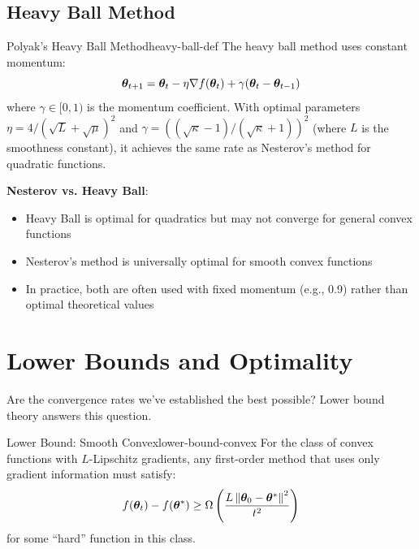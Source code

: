 \documentclass[../../main.tex]{subfiles}
\begin{document}
\subsection{Heavy Ball Method}

\begin{definition}{Polyak's Heavy Ball Method}{heavy-ball-def}
The heavy ball method uses constant momentum:
\[
    \boldsymbol{\theta}_{t+1} = \boldsymbol{\theta}_t - \eta \nabla f(\boldsymbol{\theta}_t) + \gamma(\boldsymbol{\theta}_t - \boldsymbol{\theta}_{t-1})
\]
where $\gamma \in [0, 1)$ is the momentum coefficient. With optimal parameters $\eta = 4/({\sqrt{L} + \sqrt{\mu}})^2$ and $\gamma = ((\sqrt{\kappa}-1)/(\sqrt{\kappa}+1))^2$ (where $L$ is the smoothness constant), it achieves the same rate as Nesterov's method for quadratic functions.
\end{definition}

\begin{important}
\textbf{Nesterov vs. Heavy Ball}:
\begin{itemize}
    \item Heavy Ball is optimal for quadratics but may not converge for general convex functions
    \item Nesterov's method is universally optimal for smooth convex functions
    \item In practice, both are often used with fixed momentum (e.g., 0.9) rather than optimal theoretical values
\end{itemize}
\end{important}

\section{Lower Bounds and Optimality}
\label{sec:lower-bounds}

Are the convergence rates we've established the best possible? Lower bound theory answers this question.

\begin{theorem}{Lower Bound: Smooth Convex}{lower-bound-convex}
For the class of convex functions with $L$-Lipschitz gradients, any first-order method that uses only gradient information must satisfy:
\[
    f(\boldsymbol{\theta}_t) - f(\boldsymbol{\theta}^*) \geq \Omega\left(\frac{L\left\lVert \boldsymbol{\theta}_0 - \boldsymbol{\theta}^* \right\rVert^2}{t^2}\right)
\]
for some ``hard'' function in this class.
\end{theorem}
\end{document}
